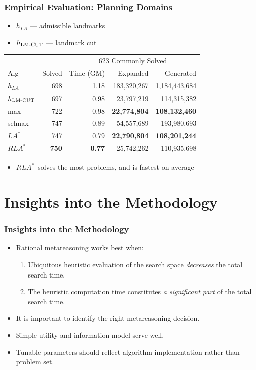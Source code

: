\documentclass{beamer}
\newcommand{\lazyastar} {\ensuremath{LA^\ast}}
\newcommand{\rationallazyastar} {\ensuremath{RLA^\ast}}
\begin{document}
\begin{frame}
\frametitle{Empirical Evaluation: Planning Domains}

\begin{itemize}
  \item $h_{LA}$ --- admissible landmarks
  \item $h_{\text{LM-CUT}}$ --- landmark cut
\end{itemize}

\begin{tabular}{|l|r||r|r|r|}
\hline
    &         & \multicolumn{3}{|c|}{623 Commonly Solved}\\
Alg &  Solved & Time (GM) &  Expanded & Generated\\
\hline
$h_{LA}$ & 	 698 &	 1.18 & 183,320,267 & 1,184,443,684\\
 $h_{\text{LM-CUT}}$ &	 697 &	 0.98 & 23,797,219 & 114,315,382\\
 max &	 722 &	 0.98 & \textbf{22,774,804} & \textbf{108,132,460}\\ 
 selmax &	 747 & 	 0.89 & 54,557,689 & 193,980,693\\
\hline 
 \lazyastar	& 747 &	 0.79 & \textbf{22,790,804} & \textbf{108,201,244}\\
 \rationallazyastar &	 \textbf{750} &	 \textbf{0.77} & 25,742,262 &
 110,935,698\\
\hline 
\end{tabular}

\begin{itemize}
  \item \rationallazyastar~solves the most problems, and is fastest on average
\end{itemize}
\end{frame}


\section{Insights into the Methodology}
\begin{frame}
\frametitle{Insights into the Methodology}
\begin{itemize}
\item Rational metareasoning works best when:
\begin{enumerate}
\item Ubiquitous heuristic evaluation of the search space \emph{decreases} the total search
  time.
\item The heuristic computation time constitutes \emph{a significant part} of
  the total search time. 
\end{enumerate}
\item It is important to identify the right metareasoning decision.
\item Simple utility and information model serve well.
\item Tunable parameters should reflect algorithm implementation
  rather than problem set.
\end{itemize}
\end{frame}
\end{document}
